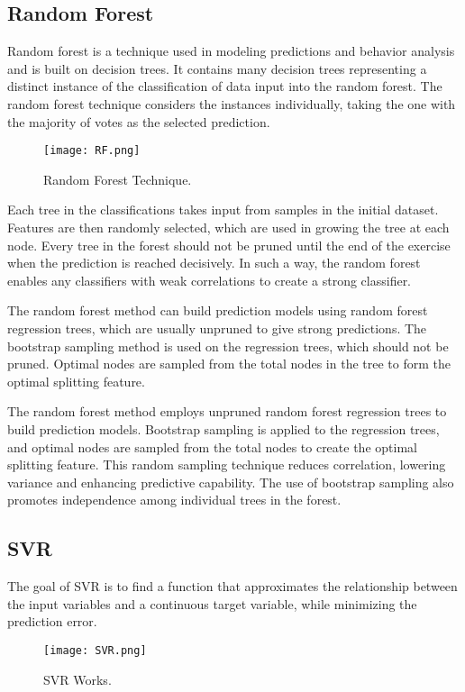 \documentclass{ieeeojies}
\begin{document}
\subsection{Random Forest}
Random forest is a technique used in modeling predictions and behavior analysis and is built on decision trees. It contains many decision trees representing a distinct instance of the classification of data input into the random forest. The random forest technique considers the instances individually, taking the one with the majority of votes as the selected prediction.

\begin{figure}[!ht]
      \centering
      \texttt{[image: RF.png]} 
      \caption{Random Forest Technique.}
      \label{fig:ten_anh}
    \end{figure}
Each tree in the classifications takes input from samples in the initial dataset. Features are then randomly selected, which are used in growing the tree at each node. Every tree in the forest should not be pruned until the end of the exercise when the prediction is reached decisively. In such a way, the random forest enables any classifiers with weak correlations to create a strong classifier.

The random forest method can build prediction models using random forest regression trees, which are usually unpruned to give strong predictions. The bootstrap sampling method is used on the regression trees, which should not be pruned. Optimal nodes are sampled from the total nodes in the tree to form the optimal splitting feature.

The random forest method employs unpruned random forest regression trees to build prediction models. Bootstrap sampling is applied to the regression trees, and optimal nodes are sampled from the total nodes to create the optimal splitting feature. This random sampling technique reduces correlation, lowering variance and enhancing predictive capability. The use of bootstrap sampling also promotes independence among individual trees in the forest.\cite{r14}
\subsection{SVR}
The goal of SVR is to find a function that approximates the relationship between the input variables and a continuous target variable, while minimizing the prediction error.

\begin{figure}[!ht]
      \centering
      \texttt{[image: SVR.png]} 
      \caption{SVR Works.}
      \label{fig:ten_anh}
    \end{figure}
\end{document}
